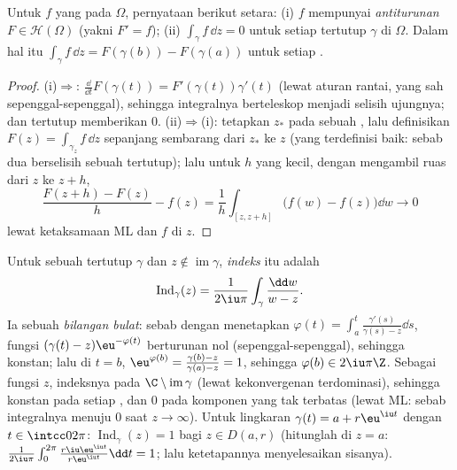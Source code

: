 \begin{proposition}[Antiturunan]\label{prop:b3:holomorphic:primitive}
Untuk $f$ yang  pada $\Omega$, pernyataan berikut setara:
(i) $f$ mempunyai \emph{antiturunan} $F \in \mathcal H(\Omega)$ (yakni $F'
= f$); (ii) $\int_\gamma f\,\dd z = 0$ untuk setiap  tertutup
$\gamma$ di $\Omega$. Dalam hal itu $\int_\gamma f\,\dd z =
F(\gamma(b)) - F(\gamma(a))$ untuk setiap .
\end{proposition}

\begin{proof}
(i)$\Rightarrow$: $\frac{\dd}{\dd t}F(\gamma(t)) =
F'(\gamma(t))\gamma'(t)$ (lewat aturan rantai, yang sah sepenggal-sepenggal), sehingga
integralnya berteleskop menjadi selisih ujungnya; dan  tertutup
memberikan $0$. (ii)$\Rightarrow$(i): tetapkan $z_*$ pada sebuah , lalu definisikan $F(z) = \int_{\gamma_z}f\,\dd z$ sepanjang sembarang
 dari $z_*$ ke $z$ (yang terdefinisi baik: sebab dua  berselisih
sebuah  tertutup); lalu untuk $h$ yang kecil, dengan mengambil ruas dari $z$ ke
$z + h$,
\[
\frac{F(z + h) - F(z)}{h} - f(z)
= \frac1h\int_{[z, z+h]}\bigl(f(w) - f(z)\bigr)\dd w
\longrightarrow 0
\]
lewat ketaksamaan ML dan  $f$ di $z$.
\end{proof}

\begin{definition}\label{def:b3:holomorphic:index}
Untuk sebuah  tertutup $\gamma$ dan $z \notin
\operatorname{im}\gamma$, \emph{indeks} itu adalah
\[
\operatorname{Ind}_\gamma(z) = \frac1{2\iu\pi}
\int_\gamma\frac{\dd w}{w - z} .
\]
Ia sebuah \emph{bilangan bulat}: sebab dengan menetapkan $\varphi(t) =
\int_a^t\frac{\gamma'(s)}{\gamma(s) - z}\dd s$, fungsi
$(\gamma(t) - z)\eu^{-\varphi(t)}$ berturunan nol
(sepenggal-sepenggal), sehingga konstan; lalu di $t = b$, $\eu^{\varphi(b)} =
\frac{\gamma(b) - z}{\gamma(a) - z} = 1$, sehingga $\varphi(b) \in
2\iu\pi\Z$. Sebagai fungsi $z$, indeksnya  pada
$\C\setminus\operatorname{im}\gamma$ (lewat kekonvergenan terdominasi),
sehingga konstan pada setiap , dan $0$ pada
komponen yang tak terbatas (lewat ML: sebab integralnya menuju $0$ saat $z \to
\infty$). Untuk lingkaran $\gamma(t) = a + r\eu^{\iu t}$ dengan $t
\in \intcc0{2\pi}$: $\operatorname{Ind}_\gamma(z) = 1$ bagi $z
\in D(a,r)$ (hitunglah di $z = a$: $\frac1{2\iu\pi}
\int_0^{2\pi}\frac{r\iu\eu^{\iu t}}{r\eu^{\iu t}}\dd t = 1$;
lalu ketetapannya menyelesaikan sisanya).
\end{definition}

